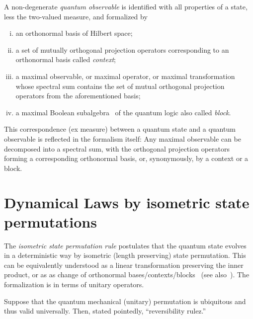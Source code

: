 A non-degenerate {\em quantum observable}
is identified with all properties of a state, less the two-valued measure, and formalized by
\begin{enumerate}[(i)]
\item
an orthonormal basis of Hilbert space;
\item
a set of mutually orthogonal projection operators corresponding to an orthonormal basis called
{\em context};
\item
a maximal observable, or maximal operator, or maximal transformation
whose spectral sum contains the set of mutual orthogonal projection operators from the aforementioned basis;
\item
a maximal Boolean subalgebra~\cite{greechie:71,kalmbach-83,nav:91,pulmannova-91} of the quantum logic also called
{\em block}.
\end{enumerate}


This correspondence (ex measure) between a quantum state and a quantum observable is reflected in the formalism itself:
Any maximal observable can be decomposed into a spectral sum, with the orthogonal projection operators
forming a corresponding orthonormal basis, or, synonymously, by a context or a block.

\section{Dynamical Laws by isometric state permutations}
\label{2016-pu-book-chapter-qm-dlisp}

The {\em isometric state permutation rule} postulates that
the quantum state evolves in a deterministic way by isometric (length preserving) state permutation.
This can be equivalently understood
as a linear transformation preserving the inner product, or as
as change of orthonormal bases/contexts/blocks~\cite[\S~74]{halmos-vs} (see also~\cite{Schwinger.60}).
The formalization is in terms of unitary operators.


Suppose that the quantum mechanical (unitary) permutation is ubiquitous and thus valid universally.
Then, stated pointedly, ``reversibility rulez.''

